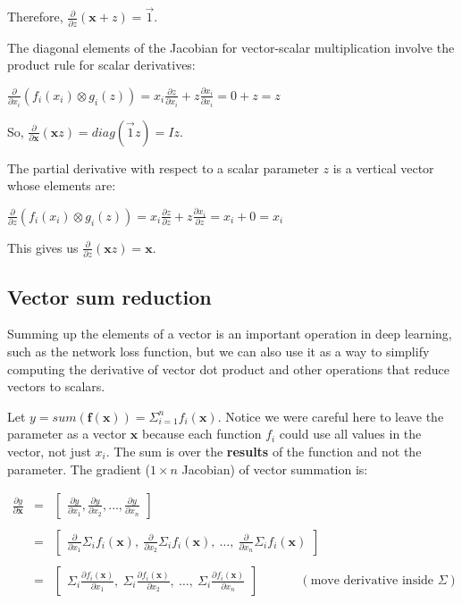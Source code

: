 \documentclass[11pt]{article}
\begin{document}
Therefore, $\frac{\partial}{\partial z} ( \mathbf{x} + z ) = \vec{1}$.

The diagonal elements of the Jacobian for vector-scalar multiplication involve the product rule for scalar derivatives:

$\frac{\partial}{\partial x_i} ( f_i(x_i) \otimes g_i(z) ) = x_i  \frac{\partial z}{\partial x_i} + z  \frac{\partial x_i}{\partial x_i} = 0 + z = z$

So, $\frac{\partial}{\partial \mathbf{x}} ( \mathbf{x} z ) = diag(\vec{1}  z) = I z$. 

The partial derivative with respect to a scalar parameter $z$ is a vertical vector whose elements are:

$\frac{\partial}{\partial z} ( f_i(x_i) \otimes g_i(z) ) = x_i \frac{\partial z}{\partial z} + z \frac{\partial x_i}{\partial z} = x_i + 0 = x_i$

This gives us $\frac{\partial}{\partial z} ( \mathbf{x} z ) = \mathbf{x}$.

\subsection{Vector sum reduction}

Summing up the elements of a vector is an important operation in deep learning, such as the network loss function, but we can also use it as a way to simplify computing the derivative of vector dot product and other operations that reduce vectors to scalars.

Let $y = sum( \mathbf{f}(\mathbf{x})) = \Sigma_{i=1}^n f_i(\mathbf{x})$.  Notice we were careful here to leave the parameter as a vector $\mathbf{x}$ because each function $f_i$ could use all values in the vector, not just $x_i$. The sum is over the {\bf results} of the function and not the parameter. The gradient ($1 \times n$ Jacobian) of vector summation is:

$
\begin{array}{lcl}
\frac{\partial y}{\partial \mathbf{x}} & = & \begin{bmatrix} \frac{\partial y}{\partial x_1}, \frac{\partial y}{\partial x_2}, \ldots, \frac{\partial y}{\partial x_n} \end{bmatrix}\\\\
 & = & \begin{bmatrix} \frac{\partial}{\partial x_1} \Sigma_i f_i(\mathbf{x}),~ \frac{\partial}{\partial x_2} \Sigma_i f_i(\mathbf{x}),~ \ldots,~ \frac{\partial}{\partial x_n} \Sigma_i  f_i(\mathbf{x}) \end{bmatrix} \\\\
 & = & \begin{bmatrix} \Sigma_i \frac{\partial f_i(\mathbf{x})}{\partial x_1},~ \Sigma_i \frac{\partial f_i(\mathbf{x})}{\partial x_2},~ \ldots,~ \Sigma_i \frac{\partial f_i(\mathbf{x})}{\partial x_n}  \end{bmatrix}~~~~~~~~~~~~~~~(\text{move derivative inside }\Sigma)\\\\
\end{array}
$
\end{document}
